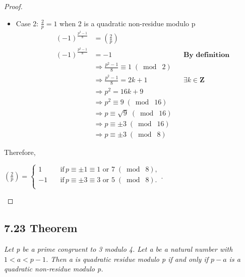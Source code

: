\documentclass{article}
\begin{document}
\begin{proof}
\begin{itemize}
    \item Case 2: $\frac{2}{p} = 1$ when 2 is a quadratic non-residue modulo p
    \begin{align*}
    && (-1)^{\frac{p^2-1}{8}}&= (\frac{2}{p})&&\\
    && (-1)^{\frac{p^2-1}{8}}&= -1 && \textbf{By definition}\\
    && &\Longrightarrow \frac{p^2-1}{8} \equiv 1 \;(\bmod\; 2)&&\\
    && &\Longrightarrow \frac{p^2-1}{8} = 2k + 1&&\textbf{$\exists k\in \mathbf{Z}$}\\
    && &\Longrightarrow p^2 = 16k + 9&&\\
    && &\Longrightarrow p^2 \equiv 9 \;(\bmod\; 16) &&\\
    && &\Longrightarrow p \equiv \sqrt{9} \;(\bmod\; 16) &&\\
    && &\Longrightarrow p \equiv \pm3 \;(\bmod\; 16) &&\\
    && &\Longrightarrow p \equiv \pm3 \;(\bmod\; 8) &&
\end{align*}
\end{itemize}
Therefore, 
\begin{center}
    $(\frac{2}{p}) = \begin{cases}
          1 \quad &\text{if} \, p \equiv \pm1 \equiv 1 \text{ or } 7\;(\bmod\; 8),\\
          -1 \quad &\text{if} \, p \equiv \pm3 \equiv 3 \text{ or } 5 \;(\bmod\; 8).\\
     \end{cases}$.
\end{center}
\end{proof}

\subsection*{7.23 Theorem} 
\quad \textit{Let p be a prime congruent to 3 modulo 4. Let a be a natural number with $1<a<p-1$. Then a is quadratic residue modulo p if and only if $p-a$ is a quadratic non-residue modulo p.}
\end{document}

